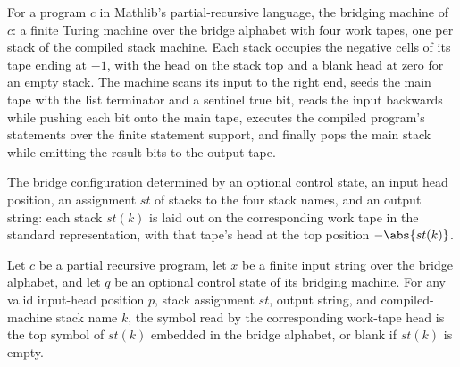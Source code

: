 \begin{definition}
\label{Turing.bridgeTM}
\leanok
{}
For a program $c$ in Mathlib's partial-recursive language, the bridging machine of
$c$: a finite Turing machine over the bridge alphabet with four work tapes, one per
stack of the compiled stack machine.  Each stack occupies the negative cells of its
tape ending at $-1$, with the head on the stack top and a blank head at zero for an
empty stack.  The machine scans its input to the right end, seeds the main tape with
the list terminator and a sentinel true bit, reads the input backwards while pushing
each bit onto the main tape, executes the compiled program's statements over the
finite statement support, and finally pops the main stack while emitting the result
bits to the output tape.
\end{definition}

\begin{definition}
\label{Turing.bridgeCfg}
\leanok
{}
The bridge configuration determined by an optional control state, an input head
position, an assignment $st$ of stacks to the four stack names, and an output
string: each stack $st(k)$ is laid out on the corresponding work tape in the
standard representation, with that tape's head at the top position $-\abs{st(k)}$.
\end{definition}

\begin{lemma}
\label{Turing.bridgeCfg_read}
\leanok
{}
Let $c$ be a partial recursive program, let $x$ be a finite input string over the bridge
alphabet, and let $q$ be an optional control state of its bridging machine. For any
valid input-head position $p$, stack assignment $st$, output string, and
compiled-machine stack name $k$, the symbol read by the corresponding work-tape head is
the top symbol of $st(k)$ embedded in the bridge alphabet, or blank if $st(k)$ is empty.
\end{lemma}

